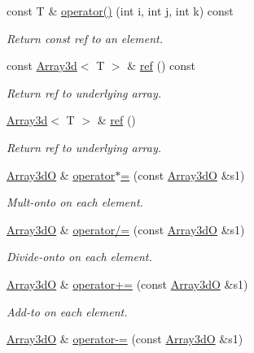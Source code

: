\begin{DoxyCompactItemize}
const T \& \mbox{\hyperlink{classADAT_1_1Array3dO_a3b4254a3812d8a02c4510f4fa635dd9c}{operator()}} (int i, int j, int k) const
\begin{DoxyCompactList}\small\item\em Return const ref to an element. \end{DoxyCompactList}\item 
const \mbox{\hyperlink{classXMLArray_1_1Array3d}{Array3d}}$<$ T $>$ \& \mbox{\hyperlink{classADAT_1_1Array3dO_a7ad48358af907cbaf3cf50fad298a088}{ref}} () const
\begin{DoxyCompactList}\small\item\em Return ref to underlying array. \end{DoxyCompactList}\item 
\mbox{\hyperlink{classXMLArray_1_1Array3d}{Array3d}}$<$ T $>$ \& \mbox{\hyperlink{classADAT_1_1Array3dO_ad56a8ea2aac56eba9b8b74af06e79970}{ref}} ()
\begin{DoxyCompactList}\small\item\em Return ref to underlying array. \end{DoxyCompactList}\item 
\mbox{\hyperlink{classADAT_1_1Array3dO}{Array3dO}} \& \mbox{\hyperlink{classADAT_1_1Array3dO_a739c7272b271536ac15a00b5da43b6d6}{operator$\ast$=}} (const \mbox{\hyperlink{classADAT_1_1Array3dO}{Array3dO}} \&s1)
\begin{DoxyCompactList}\small\item\em Mult-\/onto on each element. \end{DoxyCompactList}\item 
\mbox{\hyperlink{classADAT_1_1Array3dO}{Array3dO}} \& \mbox{\hyperlink{classADAT_1_1Array3dO_a634dcf5154efc0a7496d50f4f258978d}{operator/=}} (const \mbox{\hyperlink{classADAT_1_1Array3dO}{Array3dO}} \&s1)
\begin{DoxyCompactList}\small\item\em Divide-\/onto on each element. \end{DoxyCompactList}\item 
\mbox{\hyperlink{classADAT_1_1Array3dO}{Array3dO}} \& \mbox{\hyperlink{classADAT_1_1Array3dO_a5d72c8e7dd54897fe898b07616123229}{operator+=}} (const \mbox{\hyperlink{classADAT_1_1Array3dO}{Array3dO}} \&s1)
\begin{DoxyCompactList}\small\item\em Add-\/to on each element. \end{DoxyCompactList}\item 
\mbox{\hyperlink{classADAT_1_1Array3dO}{Array3dO}} \& \mbox{\hyperlink{classADAT_1_1Array3dO_a5c840f5014264fdee101194d22f237e0}{operator-\/=}} (const \mbox{\hyperlink{classADAT_1_1Array3dO}{Array3dO}} \&s1)

\end{DoxyCompactItemize}
